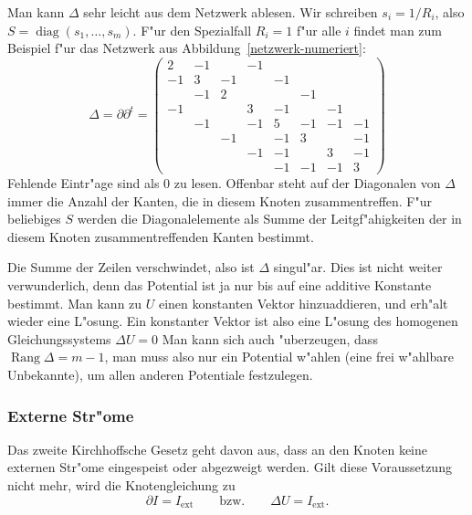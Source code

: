 Man kann $\Delta$ sehr leicht aus dem Netzwerk ablesen. Wir schreiben
$s_i=1/R_i$, also $S=\operatorname{diag}(s_1,\dots,s_m)$.
F"ur den Spezialfall
$R_i=1$ f"ur alle $i$ findet man zum Beispiel f"ur das Netzwerk
aus Abbildung~\ref{netzwerk-numeriert}:
\begin{equation}
\Delta
=
\partial \partial^t
=
\begin{pmatrix}
   2& -1&   & -1&   &   &   &   \\
  -1&  3& -1&   & -1&   &   &   \\
    & -1&  2&   &   & -1&   &   \\
  -1&   &   &  3& -1&   & -1&   \\
    & -1&   & -1&  5& -1& -1& -1\\
    &   & -1&   & -1&  3&   & -1\\
    &   &   & -1& -1&   &  3& -1\\
    &   &   &   & -1& -1& -1&  3
\end{pmatrix}
\label{samplelaplace}
\end{equation}
Fehlende Eintr"age sind als 0 zu lesen. Offenbar steht auf der Diagonalen
von $\Delta$ immer die Anzahl der Kanten, die in diesem 
Knoten zusammentreffen. F"ur beliebiges $S$ werden die Diagonalelemente
als Summe der Leitgf"ahigkeiten der in diesem Knoten zusammentreffenden
Kanten bestimmt.

Die Summe der Zeilen verschwindet, also ist $\Delta$ singul"ar.
Dies ist nicht weiter verwunderlich, denn das Potential ist ja nur
bis auf eine additive Konstante bestimmt. Man kann zu $U$ einen
konstanten Vektor hinzuaddieren, und erh"alt wieder eine L"osung.
Ein konstanter Vektor ist also eine L"osung des homogenen 
Gleichungssystems $\Delta U=0$
Man kann sich auch "uberzeugen, dass $\operatorname{Rang}\Delta = m-1$,
man muss also nur ein Potential w"ahlen (eine frei w"ahlbare Unbekannte),
um allen anderen Potentiale festzulegen.

\subsubsection{Externe Str"ome}
Das zweite Kirchhoffsche Gesetz geht davon aus, dass an den
Knoten keine externen Str"ome eingespeist oder abgezweigt werden.
Gilt diese Voraussetzung nicht mehr, wird die Knotengleichung zu
\begin{equation}
\partial I=I_{\text{ext}}
\qquad
\text{bzw.}
\qquad
\Delta U=I_{\text{ext}}.
\label{externestroeme}
\end{equation}

